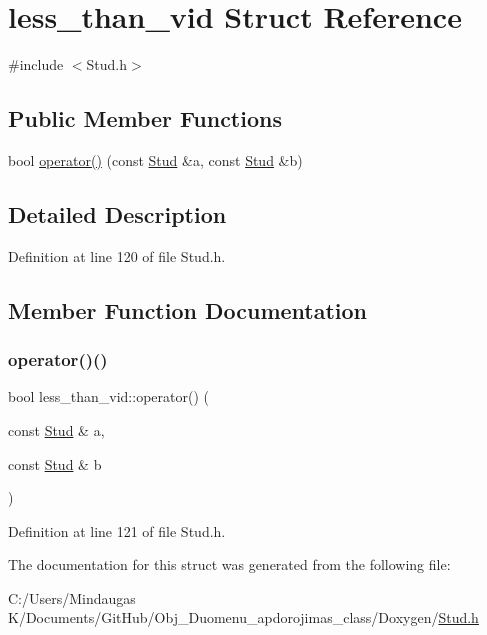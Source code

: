 \hypertarget{structless__than__vid}{}\section{less\+\_\+than\+\_\+vid Struct Reference}
\label{structless__than__vid}


{\ttfamily \#include $<$Stud.\+h$>$}

\subsection*{Public Member Functions}
\begin{DoxyCompactItemize}
\item 
bool \mbox{\hyperlink{structless__than__vid_adecd531ff9e48d74c53794b17cc056b0}{operator()}} (const \mbox{\hyperlink{class_stud}{Stud}} \&a, const \mbox{\hyperlink{class_stud}{Stud}} \&b)
\end{DoxyCompactItemize}


\subsection{Detailed Description}


Definition at line 120 of file Stud.\+h.



\subsection{Member Function Documentation}
\mbox{\label{structless__than__vid_adecd531ff9e48d74c53794b17cc056b0}} 
\subsubsection{\texorpdfstring{operator()()}{operator()()}}
{\footnotesize\ttfamily bool less\+\_\+than\+\_\+vid\+::operator() (\begin{DoxyParamCaption}\item[{const \mbox{\hyperlink{class_stud}{Stud}} \&}]{a,  }\item[{const \mbox{\hyperlink{class_stud}{Stud}} \&}]{b }\end{DoxyParamCaption})\hspace{0.3cm}{\ttfamily [inline]}}



Definition at line 121 of file Stud.\+h.



The documentation for this struct was generated from the following file\+:\begin{DoxyCompactItemize}
\item 
C\+:/\+Users/\+Mindaugas K/\+Documents/\+Git\+Hub/\+Obj\+\_\+\+Duomenu\+\_\+apdorojimas\+\_\+class/\+Doxygen/\mbox{\hyperlink{_stud_8h}{Stud.\+h}}\end{DoxyCompactItemize}
